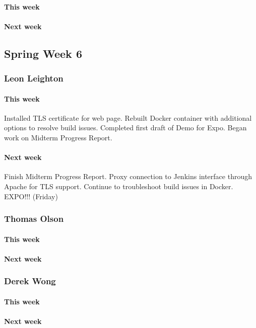 \documentclass[10pt,letterpaper,onecolumn,draftclsnofoot]{IEEEtran}
\begin{document}
\paragraph{This week}
\paragraph{Next week}


\subsection{Spring Week 6}
\subsubsection{Leon Leighton}
\paragraph{This week}Installed TLS certificate for web page.  
Rebuilt Docker container with additional options to resolve build issues.  
Completed first draft of Demo for Expo.  
Began work on Midterm Progress Report.
\paragraph{Next week}Finish Midterm Progress Report.  
Proxy connection to Jenkins interface through Apache for TLS support.  
Continue to troubleshoot build issues in Docker.  
EXPO!!! (Friday)


\subsubsection{Thomas Olson}
\paragraph{This week}
\paragraph{Next week}


\subsubsection{Derek Wong}
\paragraph{This week}
\paragraph{Next week}
\end{document}
